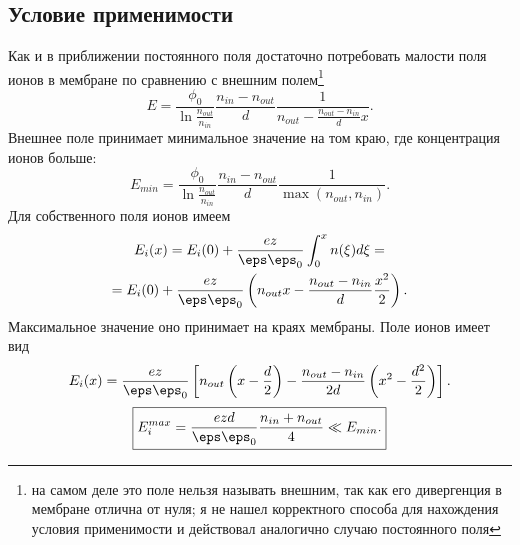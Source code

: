 \subsection{Условие применимости}
    Как и в приближении постоянного поля достаточно потребовать малости поля
    ионов в мембране по сравнению с внешним полем\footnote{на самом деле это
    поле нельзя называть внешним, так как его дивергенция в мембране отлична от
    нуля; я не нашел корректного способа для нахождения условия применимости и
    действовал аналогично случаю постоянного поля}
    \[
        E = \frac{\phi_0}{\ln\frac{n_{out}}{n_{in}}}
            \frac{n_{in} - n_{out}}{d}
            \frac{1}{n_{out} - \frac{n_{out} - n_{in}}{d} x}.
    \]
    Внешнее поле принимает минимальное значение на том краю, где концентрация
    ионов больше:
    \[
        E_{min} = \frac{\phi_0}{\ln\frac{n_{out}}{n_{in}}}
            \frac{n_{in} - n_{out}}{d}\frac{1}{\max(n_{out}, n_{in})}.
    \]
    Для собственного поля ионов имеем
    \begin{gather}
        E_i(x) = E_i(0) + \frac{ez}{\eps\eps_0}\int_0^x n(\xi)d\xi = \nonumber\\
        = E_i(0) + \frac{ez}{\eps\eps_0}\left(
        n_{out} x - \frac{n_{out} - n_{in}}{d}\frac{x^2}{2}\right).
    \end{gather}
    Максимальное значение оно принимает на краях мембраны. Поле ионов имеет вид
    \begin{equation}
        E_i(x) = \frac{ez}{\eps\eps_0}\left[
        n_{out} \left(x-\frac{d}{2}\right) - \frac{n_{out} - n_{in}}{2d}
        \left(x^2 - \frac{d^2}{2}\right)
        \right].
    \end{equation}
    \begin{equation}
        \boxed{
        E_i^{max} = \frac{ezd}{\eps\eps_0}\frac{n_{in}+n_{out}}{4} \ll E_{min}.}
    \end{equation}

